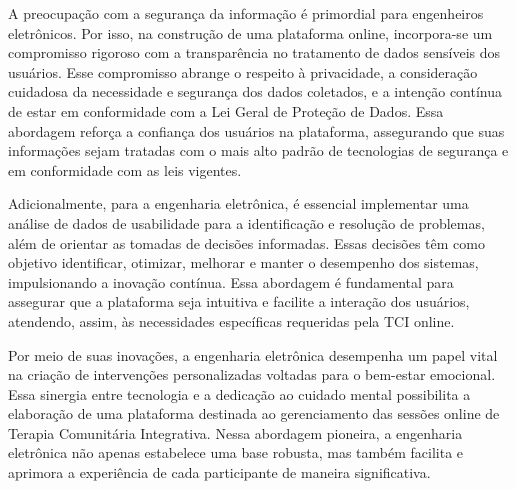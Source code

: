 A preocupação com a segurança da informação é primordial para engenheiros eletrônicos. Por isso, na construção de uma plataforma online, incorpora-se um compromisso rigoroso com a transparência no tratamento de dados sensíveis dos usuários. Esse compromisso abrange o respeito à privacidade, a consideração cuidadosa da necessidade e segurança dos dados coletados, e a intenção contínua de estar em conformidade com a Lei Geral de Proteção de Dados\cite{LGPD}. Essa abordagem reforça a confiança dos usuários na plataforma, assegurando que suas informações sejam tratadas com o mais alto padrão de tecnologias de segurança e em conformidade com as leis vigentes.

Adicionalmente, para a engenharia eletrônica, é essencial implementar uma análise de dados de usabilidade para a identificação e resolução de problemas, além de orientar as tomadas de decisões informadas. Essas decisões têm como objetivo identificar, otimizar, melhorar e manter o desempenho dos sistemas, impulsionando a inovação contínua. Essa abordagem é fundamental para assegurar que a plataforma seja intuitiva e facilite a interação dos usuários, atendendo, assim, às necessidades específicas requeridas pela TCI online.

Por meio de suas inovações, a engenharia eletrônica desempenha um papel vital na criação de intervenções personalizadas voltadas para o bem-estar emocional. Essa sinergia entre tecnologia e a dedicação ao cuidado mental possibilita a elaboração de uma plataforma destinada ao gerenciamento das sessões online de Terapia Comunitária Integrativa. Nessa abordagem pioneira, a engenharia eletrônica não apenas estabelece uma base robusta, mas também facilita e aprimora a experiência de cada participante de maneira significativa.

